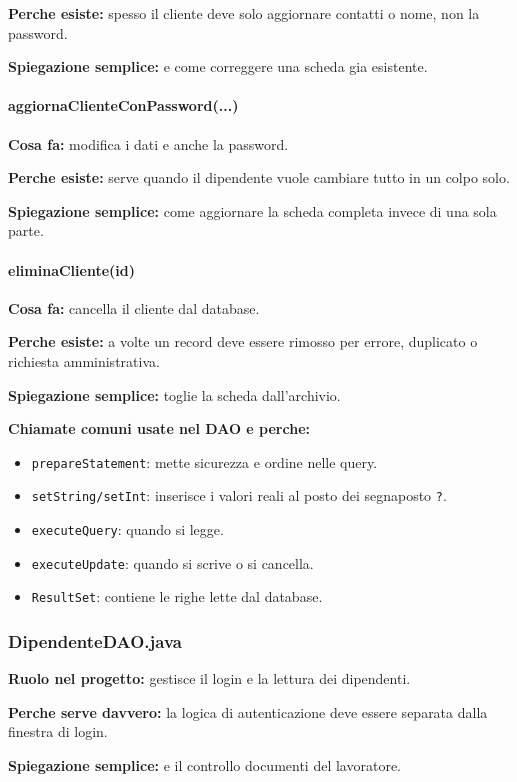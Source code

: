 \documentclass[12pt,a4paper]{article}
\begin{document}
\textbf{Perche esiste:} spesso il cliente deve solo aggiornare contatti o nome, non la password.

\textbf{Spiegazione semplice:} e come correggere una scheda gia esistente.

\paragraph{aggiornaClienteConPassword(...)}
\textbf{Cosa fa:} modifica i dati e anche la password.

\textbf{Perche esiste:} serve quando il dipendente vuole cambiare tutto in un colpo solo.

\textbf{Spiegazione semplice:} come aggiornare la scheda completa invece di una sola parte.

\paragraph{eliminaCliente(id)}
\textbf{Cosa fa:} cancella il cliente dal database.

\textbf{Perche esiste:} a volte un record deve essere rimosso per errore, duplicato o richiesta amministrativa.

\textbf{Spiegazione semplice:} toglie la scheda dall'archivio.

\textbf{Chiamate comuni usate nel DAO e perche:}
\begin{itemize}
  \item \texttt{prepareStatement}: mette sicurezza e ordine nelle query.
  \item \texttt{setString/setInt}: inserisce i valori reali al posto dei segnaposto \texttt{?}.
  \item \texttt{executeQuery}: quando si legge.
  \item \texttt{executeUpdate}: quando si scrive o si cancella.
  \item \texttt{ResultSet}: contiene le righe lette dal database.
\end{itemize}

\subsubsection*{DipendenteDAO.java}
\textbf{Ruolo nel progetto:} gestisce il login e la lettura dei dipendenti.

\textbf{Perche serve davvero:} la logica di autenticazione deve essere separata dalla finestra di login.

\textbf{Spiegazione semplice:} e il controllo documenti del lavoratore.
\end{document}
